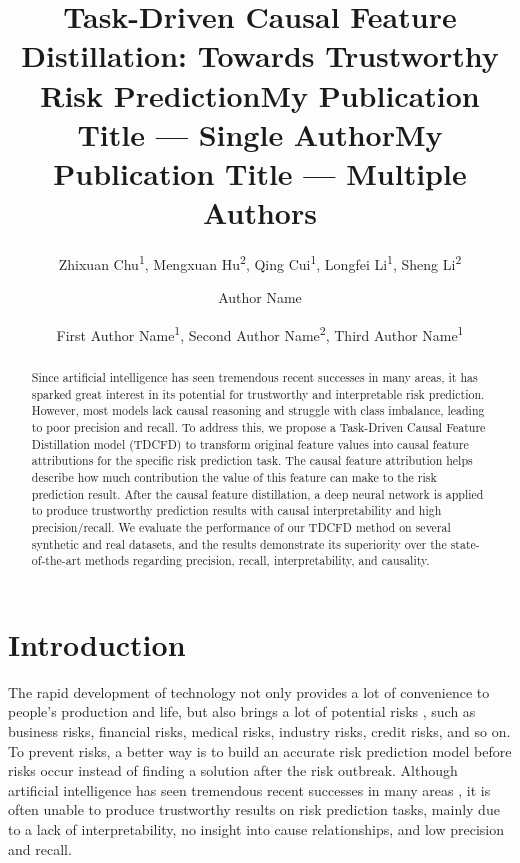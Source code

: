 \documentclass[letterpaper]{article} %
\title{Task-Driven Causal Feature Distillation: Towards Trustworthy Risk Prediction}
\author{
Zhixuan Chu\textsuperscript{\rm 1}, Mengxuan Hu\textsuperscript{\rm 2}, Qing Cui\textsuperscript{\rm 1}, Longfei Li\textsuperscript{\rm 1}, Sheng Li\textsuperscript{\rm 2}
}
\title{My Publication Title --- Single Author}
\author {
    Author Name
}
\title{My Publication Title --- Multiple Authors}
\author {
    First Author Name\textsuperscript{\rm 1},
    Second Author Name\textsuperscript{\rm 2},
    Third Author Name\textsuperscript{\rm 1}
}
\theoremstyle{definition}
\theoremstyle{remark}
\begin{document}
\maketitle


\begin{abstract}

Since artificial intelligence has seen tremendous recent successes in many areas, it has sparked great interest in its potential for trustworthy and interpretable risk prediction. However, most models lack causal reasoning and struggle with class imbalance, leading to poor precision and recall. To address this, we propose a Task-Driven Causal Feature Distillation model (TDCFD) to transform original feature values into causal feature attributions for the specific risk prediction task. The causal feature attribution helps describe how much contribution the value of this feature can make to the risk prediction result. After the causal feature distillation, a deep neural network is applied to produce trustworthy prediction results with causal interpretability and high precision/recall. We evaluate the performance of our TDCFD method on several synthetic and real datasets, and the results demonstrate its superiority over the state-of-the-art methods regarding precision, recall, interpretability, and causality.
\end{abstract}



\section{Introduction}


The rapid development of technology not only provides a lot of convenience to people's production and life, but also brings a lot of potential risks \cite{li2022backdoor,chakraborty2018adversarial,guan2023badsam,Guan,chu2023data}, such as business risks, financial risks, medical risks, industry risks, credit risks, and so on. To prevent risks, a better way is to build an accurate risk prediction model before risks occur instead of finding a solution after the risk outbreak. Although artificial intelligence has seen tremendous recent successes in many areas \cite{luan2021review,zhu2023trustworthy,wang2023towards,shi2023aging,liu2023pharmacygpt,chen2023more}, it is often unable to produce trustworthy results on risk prediction tasks, mainly due to a lack of interpretability, no insight into cause relationships, and low precision and recall.
\end{document}
